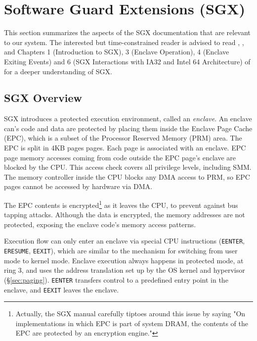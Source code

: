 \section{Software Guard Extensions (SGX)}
\label{sec:sgx}

This section summarizes the aspects of the SGX documentation that are relevant
to our system. The interested but time-constrained reader is advised to read
\cite{mckeen2013innovative}, \cite{anati2013sgx}, and Chapters 1 (Introduction
to SGX), 3 (Enclave Operation), 4 (Enclave Exiting Events) and 6 (SGX
Interactions with IA32 and Intel 64 Architecture) of \cite{intel2013sgxmanual}
for a deeper understanding of SGX.


\subsection{SGX Overview}
\label{sec:sgx_overview}

SGX introduces a protected execution environment, called an \textit{enclave}.
An enclave can's code and data are protected by placing them inside the Enclave
Page Cache (EPC), which is a subset of the Processor Reserved Memory (PRM)
area. The EPC is split in 4KB pages pages. Each page is associated with an
enclave. EPC page memory accesses coming from code outside the EPC page's
enclave are blocked by the CPU. This access check covers all privilege levels,
including SMM. The memory controller inside the CPU blocks any DMA access to
PRM, so EPC pages cannot be accessed by hardware via DMA.

The EPC contents is encrypted\footnote{Actually, the SGX manual carefully
tiptoes around this issue by saying "On implementations in which EPC is part of
system DRAM, the contents of the EPC are protected by an encryption engine."}
as it leaves the CPU, to prevent against bus tapping attacks. Although the data
is encrypted, the memory addresses are not protected, exposing the enclave
code's memory access patterns.

Execution flow can only enter an enclave via special CPU instructions
(\texttt{EENTER}, \texttt{ERESUME}, \texttt{EEXIT}), which are similar to the
mechanism for switching from user mode to kernel mode. Enclave execution always
happens in protected mode, at ring 3, and uses the address translation set up
by the OS kernel and hypervisor (\S \ref{sec:paging}). \texttt{EENTER}
transfers control to a predefined entry point in the enclave, and
\texttt{EEXIT} leaves the enclave.

